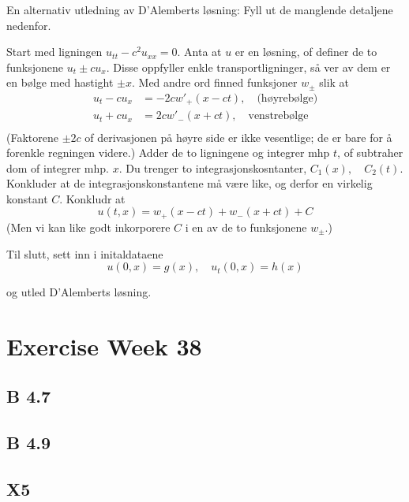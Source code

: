 \documentclass{article}
\theoremstyle{remark}
\newcommand{\newpara}
  {
  \vskip 0.4cm
  }
\begin{document}
En alternativ utledning av D'Alemberts løsning: Fyll ut de manglende detaljene nedenfor. 


\newpara

Start med ligningen $u_{tt} - c^2 u_{xx} = 0$. Anta at $u$ er en løsning, of definer de to funksjonene $u_{t} \pm cu_{x}$. Disse oppfyller enkle transportligninger, så ver av dem er en bølge med hastight $\pm x$. Med andre ord finned funksjoner $w_{\pm}$ slik at \[
\begin{split}
  u_{t} - cu_{x} &=  -2c w'_{+} \left( x - ct \right) , \quad \text{(høyrebølge)}  \\
  u_{t} + cu_{x} &=  2cw' _{-} \left( x + ct \right), \quad \text{venstrebølge}  \\
\end{split} 
\] 
(Faktorene $\pm2c$ of derivasjonen på høyre side er ikke vesentlige; de er bare for å forenkle regningen videre.) Adder de to ligningene og integrer mhp $t$, of subtraher dom of integrer mhp. $x$. Du trenger to integrasjonskosntanter, $C_{1}\left( x \right), \quad C_{2}\left( t \right) $. Konkluder at de integrasjonskonstantene må være like, og derfor en virkelig konstant $C$.  Konkludr at \[
u\left( t,x \right) = w_{+} \left( x- ct \right) + w_{-} \left( x+ct \right) + C
\] 
(Men vi kan like godt inkorporere $C$ i en av de to funksjonene $w_{\pm}$.)


\newpara
Til slutt, sett inn i initaldataene \[
u\left( 0,x \right) = g\left( x \right) , \quad  u_{t}\left( 0,x \right) = h\left( x \right) 
\] 

og utled D'Alemberts løsning.



\newpage
\section{Exercise Week 38}%
\label{sec:exercise_week_38}

\subsection{B 4.7}%
\label{sub:b_4_7}

\subsection{B 4.9}%
\label{sub:b_4_9}

\subsection{X5}%
\label{sub:x5}
\end{document}
